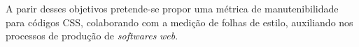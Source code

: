 A parir desses objetivos pretende-se propor uma métrica de manutenibilidade para códigos CSS, colaborando com a medição de folhas de estilo, auxiliando nos processos de produção de \textit{softwares} \textit{web}.


